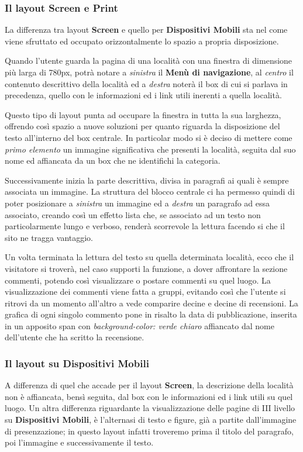 \subsubsection{Il layout Screen e Print}\label{sec:Pres-IIIliv-Screen}
La differenza tra layout \textbf{Screen} e quello per \textbf{Dispositivi
Mobili} sta nel come viene sfruttato ed occupato orizzontalmente lo spazio a
propria disposizione.

Quando l'utente guarda la pagina di una località con una finestra di
dimensione più larga di 780px, potrà notare a \textit{sinistra} il
\textbf{Menù di navigazione}, al \textit{centro} il contenuto descrittivo
della località ed a \textit{destra} noterà il box di cui si parlava in
precedenza, quello con le informazioni ed i link utili inerenti a quella
località.
 
Questo tipo di layout punta ad occupare la finestra in tutta la sua larghezza,
offrendo così spazio a nuove soluzioni per quanto riguarda la disposizione del
testo all'interno del box centrale. In particolar modo si è deciso di mettere
come \textit{primo elemento} un immagine significativa che presenti la
località, seguita dal suo nome ed affiancata da un box che ne identifichi la
categoria.

Successivamente inizia la parte descrittiva, divisa in paragrafi ai quali è
sempre associata un immagine. La struttura del blocco centrale ci ha permesso
quindi di poter posizionare a \textit{sinistra} un immagine ed a
\textit{destra} un paragrafo ad essa associato, creando così un effetto lista
che, se associato ad un testo non particolarmente lungo e verboso, renderà
scorrevole la lettura facendo si che il sito ne tragga vantaggio.

Un volta terminata la lettura del testo su quella determinata località, ecco
che il visitatore si troverà, nel caso supporti la funzione, a dover
affrontare la sezione commenti, potendo così visualizzare o postare commenti
su quel luogo. La visualizzazione dei commenti viene fatta a gruppi, evitando
così che l'utente si ritrovi da un momento all'altro a vede comparire decine e
decine di recensioni. La grafica di ogni singolo commento pone in risalto la
data di pubblicazione, inserita in un apposito span con
\textit{background-color: verde chiaro} affiancato dal nome dell'utente che ha
scritto la recensione.

\subsubsection{Il layout su Dispositivi Mobili}\label{sec:Pres-IIIliv-Mobile}
A differenza di quel che accade per il layout \textbf{Screen}, la descrizione
della località non è affiancata, bensì seguita, dal box con le informazioni ed
i link utili su quel luogo. Un altra differenza riguardante la visualizzazione
delle pagine di III livello su \textbf{Dispositivi Mobili}, è l'alternasi di
testo e figure, già a partite dall'immagine di presenzazione; in questo layout
infatti troveremo prima il titolo del paragrafo, poi l'immagine e
successivamente il testo.

